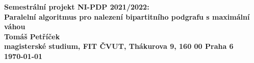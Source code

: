 \begin{center}
\bf Semestrální projekt NI-PDP 2021/2022:\\[5mm]
    Paralelní algoritmus pro nalezení bipartitního podgrafu s maximální váhou\\[5mm]
       Tomáš Petříček\\[2mm]
magisterské studium, FIT ČVUT, Thákurova 9, 160 00 Praha 6\\[2mm]
\today
\end{center}